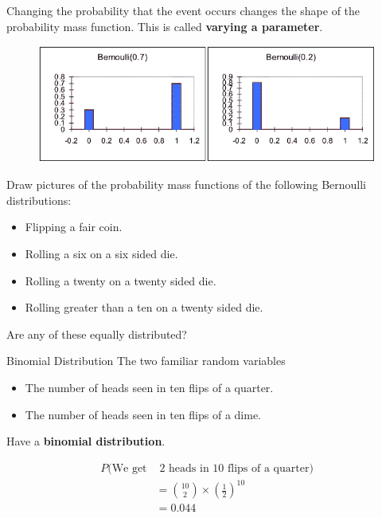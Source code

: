 %
\begin{frame}

Changing the probability that the event occurs changes the shape of the
probability mass function. This is called \textbf{varying a parameter}.

  \begin{figure}
    \includegraphics[scale=0.40]{bernoulli}
  \end{figure}

\end{frame}
%

%
\begin{frame}
Draw pictures of the probability mass functions of the following Bernoulli
distributions:

\begin{itemize}
\item Flipping a fair coin.
\item Rolling a six on a six sided die.
\item Rolling a twenty on a twenty sided die.
\item Rolling greater than a ten on a twenty sided die.
\end{itemize}

Are any of these equally distributed?
\end{frame}
%

%
\begin{frame}{Binomial Distribution}
The two familiar random variables

\begin{itemize}
\item The number of heads seen in ten flips of a quarter.
\item The number of heads seen in ten flips of a dime.
\end{itemize}

Have a \textbf{binomial distribution}.
\end{frame}
%

%
\begin{frame}

\begin{align*}
P(\text{We get} & \text{ 2 heads in 10 flips of a quarter}) \\
%
&= {{10}\choose{2}} \times \left(\frac{1}{2} \right)^{10} \\
%
&= 0.044
\end{align*}

\end{frame}
%

